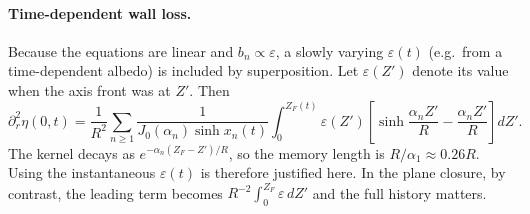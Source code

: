 \documentclass[11pt]{article}
\numberwithin{equation}{section}
\begin{document}
\paragraph{Time-dependent wall loss.} Because the equations are linear and $b_n\propto\varepsilon$, a slowly varying $\varepsilon(t)$ (e.g.\ from a time-dependent albedo) is included by superposition. Let $\varepsilon(Z')$ denote its value when the axis front was at $Z'$. Then
\begin{equation}\partial_r^2\eta(0,t)=\frac{1}{R^2}\sum_{n\ge1}\frac{1}{J_0(\alpha_n)\sinh x_n(t)}\int_0^{Z_F(t)}\varepsilon(Z')\left[\sinh\frac{\alpha_nZ'}{R}-\frac{\alpha_nZ'}{R}\right]dZ'.\end{equation}
The kernel decays as $e^{-\alpha_n(Z_F-Z')/R}$, so the memory length is $R/\alpha_1\approx0.26R$. Using the instantaneous $\varepsilon(t)$ is therefore justified here. In the plane closure, by contrast, the leading term becomes $R^{-2}\int_0^{Z_F}\varepsilon\,dZ'$ and the full history matters.
\end{document}
